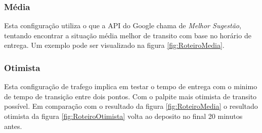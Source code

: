 \subsubsection{Média}

Esta configuração utiliza o que a API do Google chama de \textit{Melhor Sugestão}, tentando encontrar a situação média melhor de transito com base no horário de entrega. 
Um exemplo pode ser visualizado na figura \ref{fig:RoteiroMedia}.

\begin{center}
	\label{fig:RoteiroMedia}
\end{center}
\subsubsection{Otimista}

Esta configuração de trafego implica em testar o tempo de entrega com o minimo de tempo de transição entre dois pontos. Com o palpite mais otimista de transito possível. 
Em comparação com o resultado da figura \ref{fig:RoteiroMedia} o resultado otimista da figura \ref{fig:RoteiroOtimista} volta ao deposito no final 20 minutos antes.

\begin{center}
	\label{fig:RoteiroOtimista}
\end{center}
